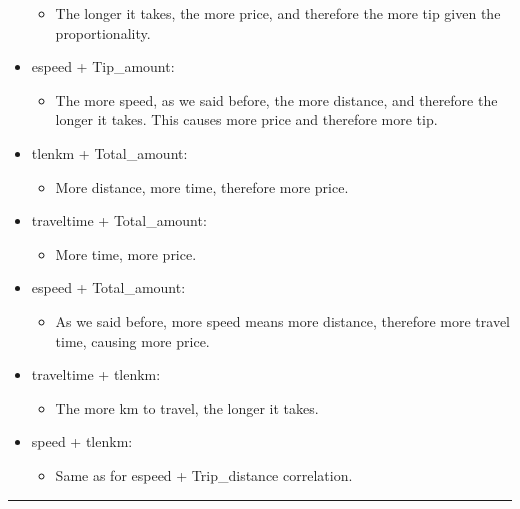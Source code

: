 \documentclass[
  18pt,
  a4paper]{article}
\providecommand{\tightlist}{%
  \setlength{\itemsep}{0pt}\setlength{\parskip}{0pt}}
\begin{document}
\begin{itemize}
  \begin{itemize}
  \tightlist
  \item
    The longer it takes, the more price, and therefore the more tip
    given the proportionality.
  \end{itemize}
\item
  espeed + Tip\_amount:

  \begin{itemize}
  \tightlist
  \item
    The more speed, as we said before, the more distance, and therefore
    the longer it takes. This causes more price and therefore more tip.
  \end{itemize}
\item
  tlenkm + Total\_amount:

  \begin{itemize}
  \tightlist
  \item
    More distance, more time, therefore more price.
  \end{itemize}
\item
  traveltime + Total\_amount:

  \begin{itemize}
  \tightlist
  \item
    More time, more price.
  \end{itemize}
\item
  espeed + Total\_amount:

  \begin{itemize}
  \tightlist
  \item
    As we said before, more speed means more distance, therefore more
    travel time, causing more price.
  \end{itemize}
\item
  traveltime + tlenkm:

  \begin{itemize}
  \tightlist
  \item
    The more km to travel, the longer it takes.
  \end{itemize}
\item
  speed + tlenkm:

  \begin{itemize}
  \tightlist
  \item
    Same as for espeed + Trip\_distance correlation.
  \end{itemize}
\end{itemize}

\begin{center}\rule{0.5\linewidth}{0.5pt}\end{center}
\end{document}
